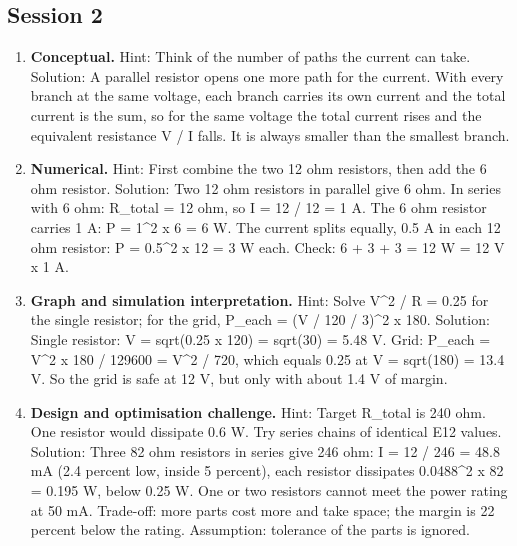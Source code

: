 \documentclass[11pt,a4paper]{article}
\begin{document}
\subsection*{Session 2}
\begin{enumerate}[nosep]
\item \textbf{Conceptual.} Hint: Think of the number of paths the current can take. Solution: A parallel resistor opens one more path for the current. With every branch at the same voltage, each branch carries its own current and the total current is the sum, so for the same voltage the total current rises and the equivalent resistance V / I falls. It is always smaller than the smallest branch.
\item \textbf{Numerical.} Hint: First combine the two 12 ohm resistors, then add the 6 ohm resistor. Solution: Two 12 ohm resistors in parallel give 6 ohm. In series with 6 ohm: R\_total = 12 ohm, so I = 12 / 12 = 1 A. The 6 ohm resistor carries 1 A: P = 1\textasciicircum{}2 x 6 = 6 W. The current splits equally, 0.5 A in each 12 ohm resistor: P = 0.5\textasciicircum{}2 x 12 = 3 W each. Check: 6 + 3 + 3 = 12 W = 12 V x 1 A.
\item \textbf{Graph and simulation interpretation.} Hint: Solve V\textasciicircum{}2 / R = 0.25 for the single resistor; for the grid, P\_each = (V / 120 / 3)\textasciicircum{}2 x 180. Solution: Single resistor: V = sqrt(0.25 x 120) = sqrt(30) = 5.48 V. Grid: P\_each = V\textasciicircum{}2 x 180 / 129600 = V\textasciicircum{}2 / 720, which equals 0.25 at V = sqrt(180) = 13.4 V. So the grid is safe at 12 V, but only with about 1.4 V of margin.
\item \textbf{Design and optimisation challenge.} Hint: Target R\_total is 240 ohm. One resistor would dissipate 0.6 W. Try series chains of identical E12 values. Solution: Three 82 ohm resistors in series give 246 ohm: I = 12 / 246 = 48.8 mA (2.4 percent low, inside 5 percent), each resistor dissipates 0.0488\textasciicircum{}2 x 82 = 0.195 W, below 0.25 W. One or two resistors cannot meet the power rating at 50 mA. Trade-off: more parts cost more and take space; the margin is 22 percent below the rating. Assumption: tolerance of the parts is ignored.
\end{enumerate}
\end{document}

